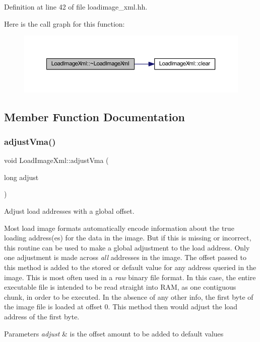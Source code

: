 Definition at line 42 of file loadimage\+\_\+xml.\+hh.

Here is the call graph for this function\+:
\nopagebreak
\begin{figure}[H]
\begin{center}
\leavevmode
\includegraphics[width=350pt]{class_load_image_xml_ab6988ec5d5f59f559db6eeac141e4e73_cgraph}
\end{center}
\end{figure}


\subsection{Member Function Documentation}
\mbox{\label{class_load_image_xml_ab6a98e9bcf8141caee525fefc6a6d115}} 
\subsubsection{\texorpdfstring{adjustVma()}{adjustVma()}}
{\footnotesize\ttfamily void Load\+Image\+Xml\+::adjust\+Vma (\begin{DoxyParamCaption}\item[{long}]{adjust }\end{DoxyParamCaption})\hspace{0.3cm}{\ttfamily [virtual]}}



Adjust load addresses with a global offset. 

Most load image formats automatically encode information about the true loading address(es) for the data in the image. But if this is missing or incorrect, this routine can be used to make a global adjustment to the load address. Only one adjustment is made across {\itshape all} addresses in the image. The offset passed to this method is added to the stored or default value for any address queried in the image. This is most often used in a {\itshape raw} binary file format. In this case, the entire executable file is intended to be read straight into R\+AM, as one contiguous chunk, in order to be executed. In the absence of any other info, the first byte of the image file is loaded at offset 0. This method then would adjust the load address of the first byte. 
\begin{DoxyParams}{Parameters}
{\em adjust} & is the offset amount to be added to default values \\
\hline
\end{DoxyParams}


